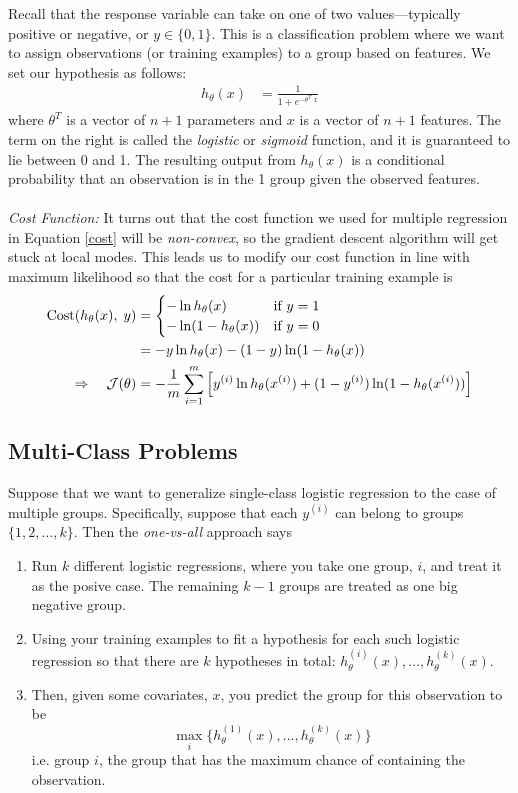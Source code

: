 \documentclass[12pt]{article}
\begin{document}
Recall that the response variable can take on one of two 
values---typically positive or negative, or $y \in \{0,1\}$.
This is a classification problem where we want to assign observations
(or training examples) to a group based on features. We set our 
hypothesis as follows:
\begin{align*}
   h_\theta(x) &= \frac{1}{1+e^{-\theta^T \; x}}
\end{align*}
where $\theta^T$ is a vector of $n+1$ parameters and $x$ is a vector
of $n+1$ features.
The term on the right is called the \emph{logistic} or \emph{sigmoid}
function, and it is guaranteed to lie between 0 and 1.
The resulting output from $h_\theta(x)$ is a conditional probability 
that an observation is in the 1 group given the observed features.
\\
\\
{\sl Cost Function:} It turns out that the cost function we used
for multiple regression in Equation \ref{cost} will be 
\emph{non-convex}, so the gradient descent algorithm will get stuck
at local modes.  This leads us to modify our cost function in 
line with maximum likelihood so that
the cost for a particular training example is
\begin{align}
    \text{Cost}(h_\theta(x),\;y) &= \begin{cases}
      -\ln h_\theta(x) & \text{if $y=1$} \\
      -\ln (1-h_\theta(x)) &\text{if $y=0$} \end{cases}\notag\\
    &=-y \ln h_\theta(x)- (1-y) \ln(1-h_\theta(x))\\
    \Rightarrow \quad
    \mathcal{J}(\theta) &= -\frac{1}{m}\sum^m_{i=1}\left[
    y^{(i)} \ln h_\theta(x^{(i)}) +(1-y^{(i)})\ln (1-h_\theta(x^{(i)})
    )\right]
\end{align}


\subsection{Multi-Class Problems}

Suppose that we want to generalize single-class logistic regression
to the case of multiple groups. Specifically, suppose that each
$y^{(i)}$ can belong to groups $\{1,2,\ldots,k\}$. Then the
\emph{one-vs-all} approach says
\begin{enumerate}
   \item Run $k$ different logistic regressions, where you take one 
      group, $i$, and treat it as the posive case. The remaining
      $k-1$ groups are treated as one big negative group.
   \item Using your training examples 
      to fit a hypothesis for each such logistic regression so that 
      there are $k$ hypotheses in total: $h_\theta^{(i)}(x), \ldots,
      h_\theta^{(k)}(x)$. 
   \item Then, given some covariates, $x$, you predict the group
      for this observation to be
      \[ \max_i \{ h_\theta^{(1)}(x), \ldots, h_\theta^{(k)}(x)\} \]
      i.e. group $i$, the group that has the maximum chance
      of containing the observation.
\end{enumerate}
\end{document}
